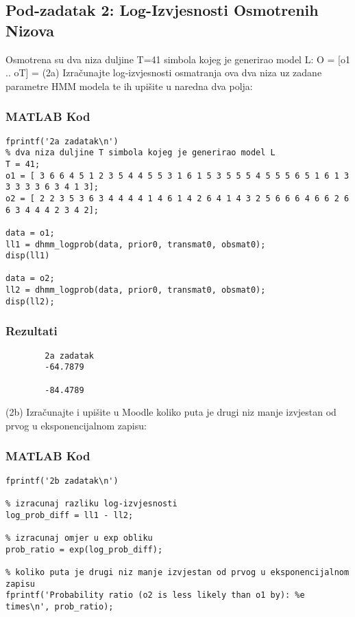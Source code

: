 \documentclass[12pt]{article}
\begin{document}
	\subsection{Pod-zadatak 2: Log-Izvjesnosti Osmotrenih Nizova}
	Osmotrena su dva niza duljine T=41 simbola kojeg je generirao model L:\newline
	O = [o1 .. oT] = \newline
	[ 3 6 6 4 5 1 2 3 5 4 4 5 5 3 1 6 1 5 3 5 5 5 4 5 5 5 6 5 1 6 1 3 3 3 3 3 6 3 4 1 3]\newline 
	[ 2 2 3 5 3 6 3 4 4 4 4 1 4 6 1 4 2 6 4 1 4 3 2 5 6 6 6 4 6 6 2 6 6 3 4 4 4 2 3 4 2]\newline
	(2a) Izračunajte log-izvjesnosti osmatranja ova dva niza uz zadane parametre HMM modela te ih upišite u naredna dva polja:
	
	\subsubsection*{MATLAB Kod}
	\begin{lstlisting}
fprintf('2a zadatak\n')
% dva niza duljine T simbola kojeg je generirao model L
T = 41;          
o1 = [ 3 6 6 4 5 1 2 3 5 4 4 5 5 3 1 6 1 5 3 5 5 5 4 5 5 5 6 5 1 6 1 3 3 3 3 3 6 3 4 1 3];           
o2 = [ 2 2 3 5 3 6 3 4 4 4 4 1 4 6 1 4 2 6 4 1 4 3 2 5 6 6 6 4 6 6 2 6 6 3 4 4 4 2 3 4 2];           

data = o1;
ll1 = dhmm_logprob(data, prior0, transmat0, obsmat0);
disp(ll1)

data = o2;
ll2 = dhmm_logprob(data, prior0, transmat0, obsmat0);
disp(ll2);
	\end{lstlisting}
	
	\subsubsection*{Rezultati}
	\begin{verbatim}
		2a zadatak
		-64.7879
		
		-84.4789
	\end{verbatim}
	
	(2b) Izračunajte i upišite u Moodle koliko puta je drugi niz manje izvjestan od prvog u eksponencijalnom zapisu:
	
	\subsubsection*{MATLAB Kod}
	\begin{lstlisting}
fprintf('2b zadatak\n')

% izracunaj razliku log-izvjesnosti
log_prob_diff = ll1 - ll2;

% izracunaj omjer u exp obliku
prob_ratio = exp(log_prob_diff);

% koliko puta je drugi niz manje izvjestan od prvog u eksponencijalnom zapisu
fprintf('Probability ratio (o2 is less likely than o1 by): %e times\n', prob_ratio);
	\end{lstlisting}
	
\end{document}
